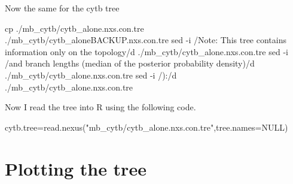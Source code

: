 \documentclass[
]{article}
\newenvironment{Shaded}{\begin{snugshade}}{\end{snugshade}}
\newcommand{\AttributeTok}[1]{\textcolor[rgb]{0.77,0.63,0.00}{#1}}
\newcommand{\ConstantTok}[1]{\textcolor[rgb]{0.00,0.00,0.00}{#1}}
\newcommand{\FunctionTok}[1]{\textcolor[rgb]{0.00,0.00,0.00}{#1}}
\newcommand{\NormalTok}[1]{#1}
\newcommand{\OtherTok}[1]{\textcolor[rgb]{0.56,0.35,0.01}{#1}}
\newcommand{\StringTok}[1]{\textcolor[rgb]{0.31,0.60,0.02}{#1}}
\begin{document}
Now the same for the cytb tree

\begin{Shaded}
\begin{Highlighting}[]
\FunctionTok{cp}\NormalTok{ ./mb\_cytb/cytb\_alone.nxs.con.tre ./mb\_cytb/cytb\_aloneBACKUP.nxs.con.tre}
\FunctionTok{sed} \AttributeTok{{-}i} \StringTok{\textquotesingle{}/Note: This tree contains information only on the topology/d\textquotesingle{}}\NormalTok{ ./mb\_cytb/cytb\_alone.nxs.con.tre}
\FunctionTok{sed} \AttributeTok{{-}i} \StringTok{\textquotesingle{}/and branch lengths (median of the posterior probability density)/d\textquotesingle{}}\NormalTok{ ./mb\_cytb/cytb\_alone.nxs.con.tre}
\FunctionTok{sed} \AttributeTok{{-}i} \StringTok{\textquotesingle{}/):/d\textquotesingle{}}\NormalTok{ ./mb\_cytb/cytb\_alone.nxs.con.tre}
\end{Highlighting}
\end{Shaded}

Now I read the tree into R using the following code.

\begin{Shaded}
\begin{Highlighting}[]
\NormalTok{cytb.tree}\OtherTok{=}\FunctionTok{read.nexus}\NormalTok{(}\StringTok{"mb\_cytb/cytb\_alone.nxs.con.tre"}\NormalTok{,}\AttributeTok{tree.names=}\ConstantTok{NULL}\NormalTok{)}
\end{Highlighting}
\end{Shaded}

\hypertarget{plotting-the-tree}{%
\section{Plotting the tree}\label{plotting-the-tree}}
\end{document}

